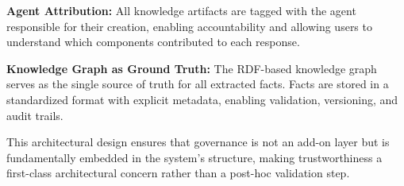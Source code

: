 \textbf{Agent Attribution:} All knowledge artifacts are tagged with the agent responsible for their creation, enabling accountability and allowing users to understand which components contributed to each response.

\textbf{Knowledge Graph as Ground Truth:} The RDF-based knowledge graph serves as the single source of truth for all extracted facts. Facts are stored in a standardized format with explicit metadata, enabling validation, versioning, and audit trails.

This architectural design ensures that governance is not an add-on layer but is fundamentally embedded in the system's structure, making trustworthiness a first-class architectural concern rather than a post-hoc validation step.

